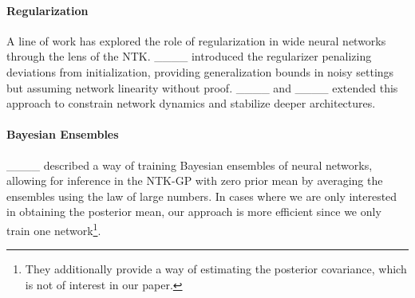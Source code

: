 
\paragraph{Regularization} A line of work has explored the role of regularization in wide neural networks through the lens of the NTK. ____ introduced the regularizer penalizing deviations from initialization, providing generalization bounds in noisy settings but assuming network linearity without proof. ____ and ____ extended this approach to constrain network dynamics and stabilize deeper architectures. 

\paragraph{Bayesian Ensembles} ____ described a way of training Bayesian ensembles of neural networks, allowing for inference in the NTK-GP with zero prior mean by averaging the ensembles using the law of large numbers. In cases where we are only interested in obtaining the posterior mean, our approach is more efficient since we only train one network\footnote{They additionally provide a way of estimating the posterior covariance, which is not of interest in our paper.}.




